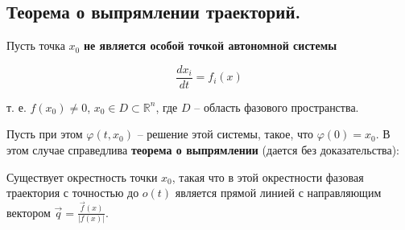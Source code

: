 \subsection{Теорема о выпрямлении траекторий.}

Пусть точка $x_0$ \textbf{не является особой точкой автономной системы} 

\begin{equation}
  \frac{d x_i}{d t} = f_i(x)
\end{equation}

т. е. $f(x_0) \neq 0$, $x_0 \in D \subset \mathbb{R}^n$, где $D$ -- область фазового пространства. 

Пусть при этом $\varphi(t, x_0)$ -- решение этой системы, такое, что $\varphi(0) = x_0$. В этом случае справедлива \textbf{теорема о выпрямлении} (дается без доказательства):

\begin{theorem}
  Существует окрестность точки $x_0$, такая что в этой окрестности фазовая траектория с точностью до $o(t)$ является прямой линией с направляющим вектором $\vec{q} = \frac{\vec{f}(x)}{|f(x)|}$.
\end{theorem}